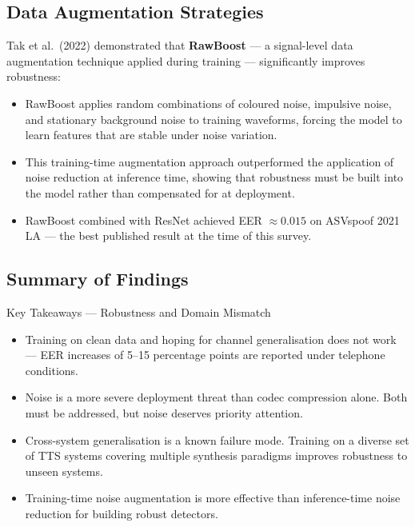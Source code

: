 \documentclass[12pt,a4paper]{article}
\begin{document}
\subsection{Data Augmentation Strategies}

Tak et al.\ (2022) demonstrated that \textbf{RawBoost} --- a signal-level data
augmentation technique applied during training --- significantly improves robustness:

\begin{itemize}
  \item RawBoost applies random combinations of coloured noise, impulsive noise, and
    stationary background noise to training waveforms, forcing the model to learn
    features that are stable under noise variation.
  \item This training-time augmentation approach outperformed the application of noise
    reduction at inference time, showing that robustness must be built into the model
    rather than compensated for at deployment.
  \item RawBoost combined with ResNet achieved EER $\approx 0.015$ on ASVspoof 2021 LA
    --- the best published result at the time of this survey.
\end{itemize}

\subsection{Summary of Findings}

\begin{keybox}{Key Takeaways --- Robustness and Domain Mismatch}
  \begin{itemize}
    \item Training on clean data and hoping for channel generalisation does not work ---
      EER increases of 5--15 percentage points are reported under telephone conditions.
    \item Noise is a more severe deployment threat than codec compression alone.
      Both must be addressed, but noise deserves priority attention.
    \item Cross-system generalisation is a known failure mode. Training on a diverse set
      of TTS systems covering multiple synthesis paradigms improves robustness to
      unseen systems.
    \item Training-time noise augmentation is more effective than inference-time noise
      reduction for building robust detectors.
  \end{itemize}
\end{keybox}
\end{document}
